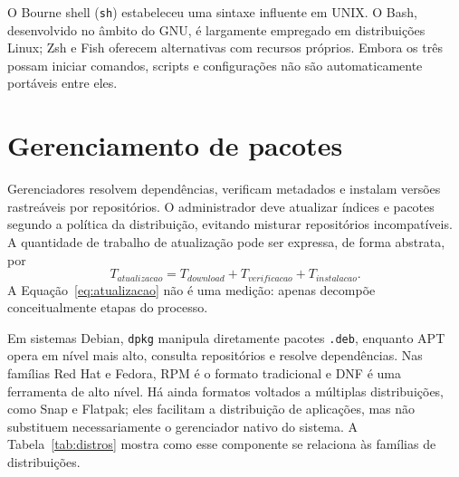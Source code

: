 \documentclass[12pt,openright,oneside,a4paper,brazil]{abntex2}
\begin{document}
O Bourne shell (\texttt{sh}) estabeleceu uma sintaxe influente em UNIX. O Bash, desenvolvido no âmbito do GNU, é largamente empregado em distribuições Linux; Zsh e Fish oferecem alternativas com recursos próprios. Embora os três possam iniciar comandos, scripts e configurações não são automaticamente portáveis entre eles.

\chapter{Gerenciamento de pacotes}
Gerenciadores resolvem dependências, verificam metadados e instalam versões rastreáveis por repositórios. O administrador deve atualizar índices e pacotes segundo a política da distribuição, evitando misturar repositórios incompatíveis. A quantidade de trabalho de atualização pode ser expressa, de forma abstrata, por
\begin{equation}\label{eq:atualizacao}
T_{atualizacao}=T_{download}+T_{verificacao}+T_{instalacao}.
\end{equation}
A Equação~\ref{eq:atualizacao} não é uma medição: apenas decompõe conceitualmente etapas do processo.

Em sistemas Debian, \texttt{dpkg} manipula diretamente pacotes \texttt{.deb}, enquanto APT opera em nível mais alto, consulta repositórios e resolve dependências. Nas famílias Red Hat e Fedora, RPM é o formato tradicional e DNF é uma ferramenta de alto nível. Há ainda formatos voltados a múltiplas distribuições, como Snap e Flatpak; eles facilitam a distribuição de aplicações, mas não substituem necessariamente o gerenciador nativo do sistema. A Tabela~\ref{tab:distros} mostra como esse componente se relaciona às famílias de distribuições.
\end{document}

